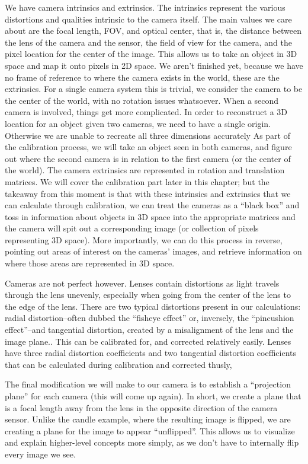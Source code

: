 \documentclass[12pt,twoside]{reedthesis}
\begin{document}
We have camera intrinsics and extrinsics. The intrinsics represent the various distortions and qualities intrinsic to the camera itself. The main values we care about are the focal length, FOV, and optical center, that is, the distance between the lens of the camera and the sensor, the field of view for the camera, and the pixel location for the center of the image. This allows us to take an object in 3D space and map it onto pixels in 2D space. We aren’t finished yet, because we have no frame of reference to where the camera exists in the world, these are the extrinsics. For a single camera system this is trivial, we consider the camera to be the center of the world, with no rotation issues whatsoever. When a second camera is involved, things get more complicated. In order to reconstruct a 3D location for an object given two cameras, we need to have a single origin. Otherwise we are unable to recreate all three dimensions accurately As part of the calibration process, we will take an object seen in both cameras, and figure out where the second camera is in relation to the first camera (or the center of the world). The camera extrinsics are represented in rotation and translation matrices. We will cover the calibration part later in this chapter; but the takeaway from this moment is that with these intrinsics and extrinsics that we can calculate through calibration, we can treat the cameras as a “black box” and toss in information about objects in 3D space into the appropriate matrices and the camera will spit out a corresponding image (or collection of pixels representing 3D space). More importantly, we can do this process in reverse, pointing out areas of interest on the cameras’ images, and retrieve information on where those areas are represented in 3D space.

Cameras are not perfect however. Lenses contain distortions as light travels through the lens unevenly, especially when going from the center of the lens to the edge of the lens. There are two typical distortions present in our calculations: radial distortion–often dubbed the “fisheye effect” or, inversely, the “pincushion effect”--and tangential distortion, created by a misalignment of the lens and the image plane.. This can be calibrated for, and corrected relatively easily. Lenses have three radial distortion coefficients and two tangential distortion coefficients that can be calculated during calibration and corrected thusly, 

The final modification we will make to our camera is to establish a “projection plane” for each camera (this will come up again). In short, we create a plane that is a focal length away from the lens in the opposite direction of the camera sensor. Unlike the candle example, where the resulting image is flipped, we are creating a plane for the image to appear “unflipped”. This allows us to visualize and explain higher-level concepts more simply, as we don’t have to internally flip every image we see.
\end{document}
